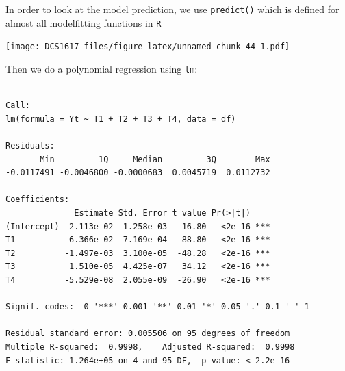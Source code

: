 \documentclass[]{book}
\newenvironment{Shaded}{\begin{snugshade}}{\end{snugshade}}
\newcommand{\KeywordTok}[1]{\textcolor[rgb]{0.13,0.29,0.53}{\textbf{{#1}}}}
\newcommand{\DataTypeTok}[1]{\textcolor[rgb]{0.13,0.29,0.53}{{#1}}}
\newcommand{\DecValTok}[1]{\textcolor[rgb]{0.00,0.00,0.81}{{#1}}}
\newcommand{\StringTok}[1]{\textcolor[rgb]{0.31,0.60,0.02}{{#1}}}
\newcommand{\CommentTok}[1]{\textcolor[rgb]{0.56,0.35,0.01}{\textit{{#1}}}}
\newcommand{\NormalTok}[1]{{#1}}
\begin{document}
In order to look at the model prediction, we use \texttt{predict()}
which is defined for almost all modelfitting functions in \texttt{R}

\begin{Shaded}
\end{Shaded}

\texttt{[image: DCS1617\_files/figure-latex/unnamed-chunk-44-1.pdf]}

Then we do a polynomial regression using \texttt{lm}:

\begin{Shaded}
\end{Shaded}

\begin{verbatim}

Call:
lm(formula = Yt ~ T1 + T2 + T3 + T4, data = df)

Residuals:
       Min         1Q     Median         3Q        Max 
-0.0117491 -0.0046800 -0.0000683  0.0045719  0.0112732 

Coefficients:
              Estimate Std. Error t value Pr(>|t|)    
(Intercept)  2.113e-02  1.258e-03   16.80   <2e-16 ***
T1           6.366e-02  7.169e-04   88.80   <2e-16 ***
T2          -1.497e-03  3.100e-05  -48.28   <2e-16 ***
T3           1.510e-05  4.425e-07   34.12   <2e-16 ***
T4          -5.529e-08  2.055e-09  -26.90   <2e-16 ***
---
Signif. codes:  0 '***' 0.001 '**' 0.01 '*' 0.05 '.' 0.1 ' ' 1

Residual standard error: 0.005506 on 95 degrees of freedom
Multiple R-squared:  0.9998,    Adjusted R-squared:  0.9998 
F-statistic: 1.264e+05 on 4 and 95 DF,  p-value: < 2.2e-16
\end{verbatim}
\end{document}
